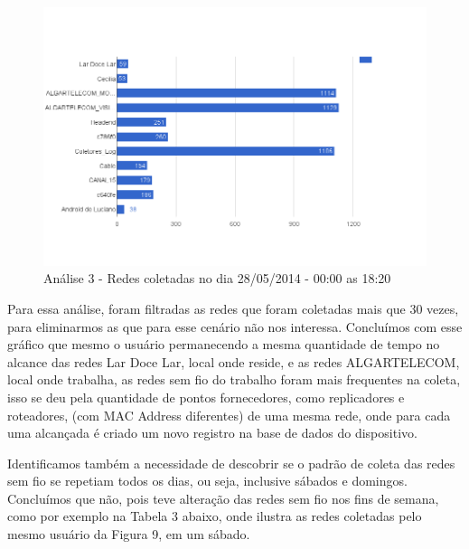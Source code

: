 \documentclass[12pt, %
openright, 
oneside,
a4paper,
brazil]{facom-ufu-abntex2}
\begin{document}
\begin{figure}[hbt]
  \includegraphics[scale=0.4]{analise3}
  \caption{Análise 3 - Redes coletadas no dia 28/05/2014 - 00:00 as 18:20}
\end{figure}


Para essa análise, foram filtradas as redes que foram coletadas mais que 30 vezes, para eliminarmos as que para esse cenário não nos interessa. Concluímos com esse gráfico que mesmo o usuário permanecendo a mesma quantidade de tempo no alcance das redes Lar Doce Lar, local onde reside,  e as redes ALGARTELECOM, local onde trabalha, as redes sem fio do trabalho foram mais frequentes na coleta, isso se deu pela quantidade de pontos fornecedores, como replicadores e roteadores, (com MAC Address diferentes) de uma mesma rede, onde para cada uma alcançada é criado um novo registro na base de dados do dispositivo. 

Identificamos também a necessidade de descobrir se o padrão de coleta das redes sem fio se repetiam todos os dias, ou seja, inclusive sábados e domingos. Concluímos que não, pois teve alteração das redes sem fio nos fins de semana,  como por exemplo na Tabela 3 abaixo, onde ilustra as redes coletadas pelo mesmo usuário da Figura 9, em um sábado.
\end{document}
